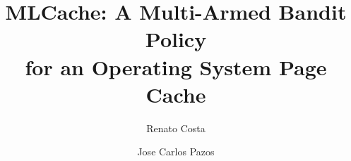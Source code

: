 \documentclass[sigconf]{acmart}
\begin{document}
\title{MLCache: A Multi-Armed Bandit Policy \\ for an Operating System Page Cache}

\author{Renato Costa}

\author{Jose Carlos Pazos}


\maketitle









\end{document}
